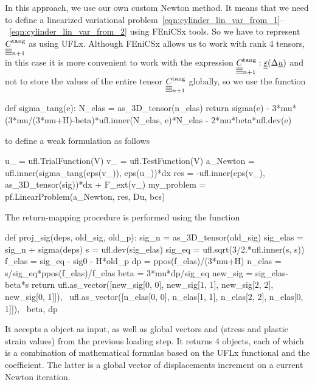\documentclass[12pt]{article}
\begin{document}
In this approach, we use our own custom Newton method. It means that we need to define a linearized variational problem~\ref{eqn:cylinder_lin_var_from_1}--~\ref{eqn:cylinder_lin_var_from_2} using FEniCSx tools. So we have to represent $\underline{\underline{\underline{\underline{C_{}}}}}_{n+1}^\text{tang}$ as  using UFLx. Although FEniCSx allows us to work with rank 4 tensors, in this case it is more convenient to work with the expression $\underline{\underline{\underline{\underline{C_{}}}}}_{n+1}^\text{tang} : \underline{\underline{\varepsilon}}(\Delta\underline{u})$ and not to store the values of the entire tensor $\underline{\underline{\underline{\underline{C_{}}}}}_{n+1}^\text{tang}$ globally, so we use the function  
\begin{pythoncode}
    def sigma_tang(e):
    N_elas = as_3D_tensor(n_elas)
    return sigma(e) - 3*mu*(3*mu/(3*mu+H)-beta)*ufl.inner(N_elas, e)*N_elas - 2*mu*beta*ufl.dev(e)  
\end{pythoncode}
to define a weak formulation as follows
\begin{pythoncode}
    u_ = ufl.TrialFunction(V)
    v_ = ufl.TestFunction(V)
    a_Newton = ufl.inner(sigma_tang(eps(v_)), eps(u_))*dx
    res = -ufl.inner(eps(v_), as_3D_tensor(sig))*dx + F_ext(v_)
    my_problem = pf.LinearProblem(a_Newton, res, Du, bcs)
\end{pythoncode}
The return-mapping procedure is performed using the  function
\begin{pythoncode}
    def proj_sig(deps, old_sig, old_p):
        sig_n = as_3D_tensor(old_sig)
        sig_elas = sig_n + sigma(deps)
        s = ufl.dev(sig_elas)
        sig_eq = ufl.sqrt(3/2.*ufl.inner(s, s))
        f_elas = sig_eq - sig0 - H*old_p
        dp = ppos(f_elas)/(3*mu+H)
        n_elas = s/sig_eq*ppos(f_elas)/f_elas
        beta = 3*mu*dp/sig_eq
        new_sig = sig_elas-beta*s
        return ufl.as_vector([new_sig[0, 0], new_sig[1, 1], new_sig[2, 2], new_sig[0, 1]]), \
            ufl.as_vector([n_elas[0, 0], n_elas[1, 1], n_elas[2, 2], n_elas[0, 1]]), \
            beta, dp       
\end{pythoncode}

It accepts a  object  as input, as well as global vectors  and  (stress and plastic strain values) from the previous loading step. It returns 4  objects, each of which is a combination of mathematical formulas based on the UFLx functional and the  coefficient. The latter is a global vector of displacements increment on a current Newton iteration.
\end{document}
